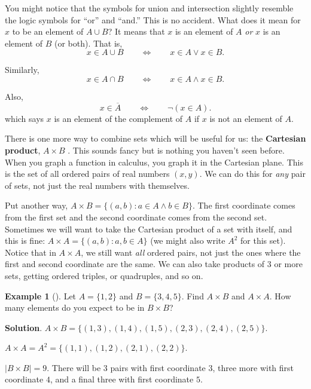 \documentclass[10pt,]{book}
\newcommand{\terminology}[1]{\textbf{#1}}
\theoremstyle{plain}
\theoremstyle{definition}
\theoremstyle{definition}
\newtheorem{example}[theorem]{Example}
\theoremstyle{definition}
\theoremstyle{definition}
\numberwithin{equation}{chapter}
\def\st{:}
\def\Iff{\Leftrightarrow}
\def\bar{\overline}
\begin{document}
\hypertarget{p-1625}{}%
You might notice that the symbols for union and intersection slightly resemble the logic symbols for ``or'' and ``and.'' This is no accident. What does it mean for \(x\) to be an element of \(A\cup B\)? It means that \(x\) is an element of \(A\) \emph{or} \(x\) is an element of \(B\) (or both). That is,%
\begin{equation*}
x \in A \cup B \qquad \Iff \qquad x \in A \vee x \in B.
\end{equation*}
%
\par
\hypertarget{p-1626}{}%
Similarly,%
\begin{equation*}
x \in A \cap B \qquad \Iff \qquad x \in A \wedge x \in B.
\end{equation*}
%
\par
\hypertarget{p-1627}{}%
Also,%
\begin{equation*}
x \in \bar A \qquad \Iff \qquad \neg (x \in A).
\end{equation*}
which says \(x\) is an element of the complement of \(A\) if \(x\) is not an element of \(A\).%
\par
\hypertarget{p-1628}{}%
There is one more way to combine sets which will be useful for us: the \terminology{Cartesian product}, \(A \times B\)\label{notation-33}
. This sounds fancy but is nothing you haven't seen before. When you graph a function in calculus, you graph it in the Cartesian plane. This is the set of all ordered pairs of real numbers \((x,y)\). We can do this for \emph{any} pair of sets, not just the real numbers with themselves.%
\par
\hypertarget{p-1629}{}%
Put another way, \(A \times B = \{(a,b) \st a \in A \wedge b \in B\}\). The first coordinate comes from the first set and the second coordinate comes from the second set. Sometimes we will want to take the Cartesian product of a set with itself, and this is fine: \(A \times A = \{(a,b) \st a, b \in A\}\) (we might also write \(A^2\) for this set). Notice that in \(A \times A\), we still want \emph{all} ordered pairs, not just the ones where the first and second coordinate are the same. We can also take products of 3 or more sets, getting ordered triples, or quadruples, and so on.%
\begin{example}[]\label{example-44}
\hypertarget{p-1630}{}%
Let \(A = \{1,2\}\) and \(B = \{3,4,5\}\). Find \(A \times B\) and \(A \times A\). How many elements do you expect to be in \(B \times B\)?%
\par\smallskip%
\noindent\textbf{Solution}.\hypertarget{solution-135}{}\quad%
\hypertarget{p-1631}{}%
\(A \times B = \{(1,3), (1,4), (1,5), (2,3), (2,4), (2,5)\}\).%
\par
\hypertarget{p-1632}{}%
\(A \times A = A^2 = \{(1,1), (1,2), (2,1), (2,2)\}\).%
\par
\hypertarget{p-1633}{}%
\(|B\times B| = 9\). There will be 3 pairs with first coordinate \(3\), three more with first coordinate \(4\), and a final three with first coordinate \(5\).%
\end{example}
\typeout{************************************************}
\typeout{************************************************}
\end{document}
